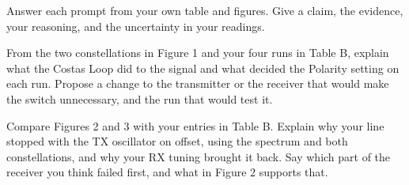 \documentclass{exam}
\begin{document}
\begin{Form}
\vspace{8pt}
\noindent{}\hfill
{}\par
{}\par

\vspace{8pt}
\noindent{}\hfill
{}\par
{}\par

\par\vspace{0pt plus 3in}\vspace{0pt plus -3in}\vspace{8pt}

Answer each prompt from your own table and figures. Give a claim, the evidence, your reasoning,
and the uncertainty in your readings.

\begin{questions}

\question From the two constellations in Figure 1 and your four runs in Table B, explain what
the Costas Loop did to the signal and what decided the Polarity setting on each run. Propose a
change to the transmitter or the receiver that would make the switch unnecessary, and the run
that would test it.
	\begin{solution}[2.0in]\end{solution}

\question Compare Figures 2 and 3 with your entries in Table B. Explain why your line stopped
with the TX oscillator on offset, using the spectrum and both constellations, and why your RX
tuning brought it back. Say which part of the receiver you think failed first, and what in
Figure 2 supports that.
	\begin{solution}[2.0in]\end{solution}


\end{questions}
\end{Form}
\end{document}
